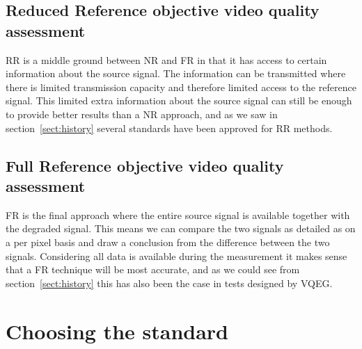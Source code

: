 \subsection{Reduced Reference objective video quality assessment}\label{sect:rr}
RR is a middle ground between NR and FR in that it has access to certain information about the source signal. The information can be transmitted where there is limited transmission capacity and therefore limited access to the reference signal. This limited extra information about the source signal can still be enough to provide better results than a NR approach, and as we saw in section~\ref{sect:history} several standards have been approved for RR methods. 


\subsection{Full Reference objective video quality assessment}\label{sect:fr}
FR is the final approach where the entire source signal is available together with the degraded signal. This means we can compare the two signals as detailed as on a per pixel basis and draw a conclusion from the difference between the two signals. Considering all data is available during the measurement it makes sense that a FR technique will be most accurate, and as we could see from section~\ref{sect:history} this has also been the case in tests designed by VQEG. 


\section{Choosing the standard}\label{sect:cts}

